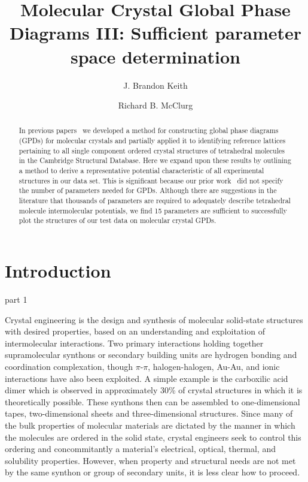 \documentclass[preprint]{revtex4}
\begin{document}
\title{Molecular Crystal Global Phase Diagrams III: Sufficient parameter space determination}

\author{J. Brandon Keith}
\author{Richard B. McClurg}


\begin{abstract}
In previous papers~\cite{Mettes04,McClurg08} we developed a method
for constructing global phase diagrams (GPDs) for molecular crystals
and partially applied it to identifying reference lattices
pertaining to all single component ordered crystal structures of
tetrahedral molecules in the Cambridge Structural Database. Here we
expand upon these results by outlining a method to derive a
representative potential characteristic of all experimental
structures in our data set. This is significant because our prior
work~\cite{Mettes04} did not specify the number of parameters needed
for GPDs. Although there are suggestions in the literature that
thousands of parameters are required to adequately describe
tetrahedral molecule intermolecular potentials, we
find 15 parameters are sufficient to successfully plot the
structures of our test data on molecular crystal GPDs.
\end{abstract}

\maketitle

\section{Introduction}

part 1

Crystal engineering is the design and synthesis of molecular solid-state structures with desired properties, based on an understanding and exploitation of intermolecular interactions. Two primary interactions holding together supramolecular synthons or secondary building units are hydrogen bonding and coordination complexation, though $\pi$-$\pi$, halogen-halogen, Au-Au, and ionic interactions have also been exploited. A simple example is the carboxilic acid dimer which is observed in approximately 30\% of crystal structures in which it is theoretically possible.  These synthons then can be assembled to one-dimensional tapes, two-dimensional sheets and three-dimensional structures. Since many of the bulk properties of molecular materials are dictated by the manner in which the molecules are ordered in the solid state, crystal engineers seek to control this ordering and concommitantly a material's electrical, optical, thermal, and solubility properties\cite{Desiraju89,Braga99,Bassoul00,Lommerse00,Holman01b,Moulton01,Motherwell02}.  However, when property and structural needs are not met by the same synthon or group of secondary units, it is less clear how to proceed.
\end{document}
